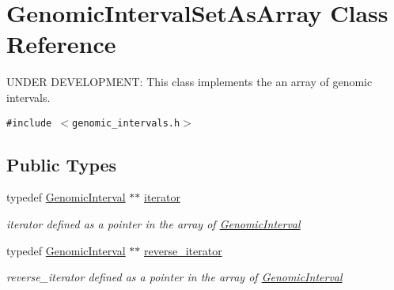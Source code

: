 \hypertarget{classGenomicIntervalSetAsArray}{
\section{GenomicIntervalSetAsArray Class Reference}
\label{classGenomicIntervalSetAsArray}
}
UNDER DEVELOPMENT: This class implements the an array of genomic intervals.  


{\tt \#include $<$genomic\_\-intervals.h$>$}

\subsection*{Public Types}
\begin{CompactItemize}
\item 
\hypertarget{classGenomicIntervalSetAsArray_1a0416c9fac7e9d965ae7fe84f1649c2}{
typedef \hyperlink{classGenomicInterval}{GenomicInterval} $\ast$$\ast$ \hyperlink{classGenomicIntervalSetAsArray_1a0416c9fac7e9d965ae7fe84f1649c2}{iterator}}
\label{classGenomicIntervalSetAsArray_1a0416c9fac7e9d965ae7fe84f1649c2}

\begin{CompactList}\small\item\em iterator defined as a pointer in the array of \hyperlink{classGenomicInterval}{GenomicInterval} \item\end{CompactList}\item 
\hypertarget{classGenomicIntervalSetAsArray_0310f5d79c529b631a5ef71ef186b41c}{
typedef \hyperlink{classGenomicInterval}{GenomicInterval} $\ast$$\ast$ \hyperlink{classGenomicIntervalSetAsArray_0310f5d79c529b631a5ef71ef186b41c}{reverse\_\-iterator}}
\label{classGenomicIntervalSetAsArray_0310f5d79c529b631a5ef71ef186b41c}

\begin{CompactList}\small\item\em reverse\_\-iterator defined as a pointer in the array of \hyperlink{classGenomicInterval}{GenomicInterval} \item\end{CompactList}\end{CompactItemize}
